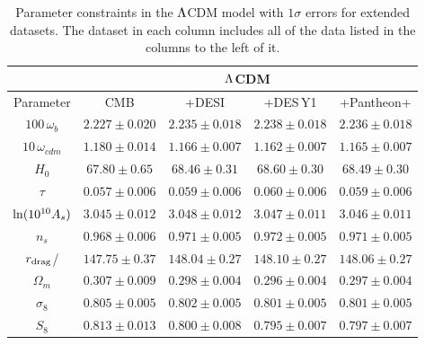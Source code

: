 \documentclass[12pt,a4paper]{article}
\newcommand{\rdrag}{r_{\rm drag}}
\newcommand\?{/\hspace{0pt}}
\begin{document}
\begin{table}
	\renewcommand{\arraystretch}{1.2}
    \small
	\centering
	\begin{tabular} {|c|| c |c | c |c|}
		\hline
		& \multicolumn{4}{c|}{$\rm \Lambda$CDM} \\
		\hline
		\hline
		Parameter & CMB & +DESI &  +DES\,Y1 & +Pantheon+ \\
		\hline
		$100\,\omega_b$ & $2.227\pm0.020$ &
		$2.235\pm0.018$ &
		$2.238\pm0.018$ &
		$2.236\pm0.018$  \\ %
		$10\,\omega_{cdm}$ & $1.180\pm0.014$ &
		$1.166\pm0.007$ &
		$1.162\pm0.007$ &
		$1.165\pm0.007$ \\ %
		$H_0$ & $67.80\pm0.65$ &
		$68.46\pm0.31$ &
		$68.60\pm0.30$ &
		$68.49\pm0.30$ \\
		$\tau$ & $0.057\pm0.006$ &
		$0.059\pm0.006$ &
		$0.060\pm0.006$ &
		$0.059\pm0.006$ \\ %
		$\!{\rm ln}(10^{10} A_s)\!$ & $3.045\pm0.012$ &
		$3.048\pm0.012$ &
		$3.047\pm0.011$ &
		$3.046\pm0.011$ \\ %
		$n_s$ & $0.968\pm0.006$ &
		$0.971\pm0.005$ &
		$0.972\pm0.005$ &
		$0.971\pm0.005$ \\ %
		\hline   
		$\rdrag$/\text{Mpc} & $147.75\pm0.37$ &
		$148.04\pm0.27$ &
		$148.10\pm0.27$ &
		$148.06\pm0.27$ \\    %
		$\Omega_m$ & $0.307\pm0.009$ &
		$0.298\pm0.004$ &
		$0.296\pm0.004$ &
		$0.297\pm0.004$ \\ %
		$\sigma_8$ & $0.805\pm0.005$ &
		$0.802\pm0.005$ &
		$0.801\pm0.005$ &
		$0.801\pm0.005$ \\ %
		$S_8$ & $0.813\pm0.013$ &
		$0.800\pm0.008$ &
		$0.795\pm0.007$ &
		$0.797\pm0.007$ \\
		\hline
	\end{tabular}
	\caption {Parameter constraints in the $\rm \Lambda$CDM model with $1\sigma$ errors for extended datasets. The dataset in each column includes all of the data listed in the columns to the left of it.}
	\label{tab:tLCDM2}
\end{table}
\end{document}
